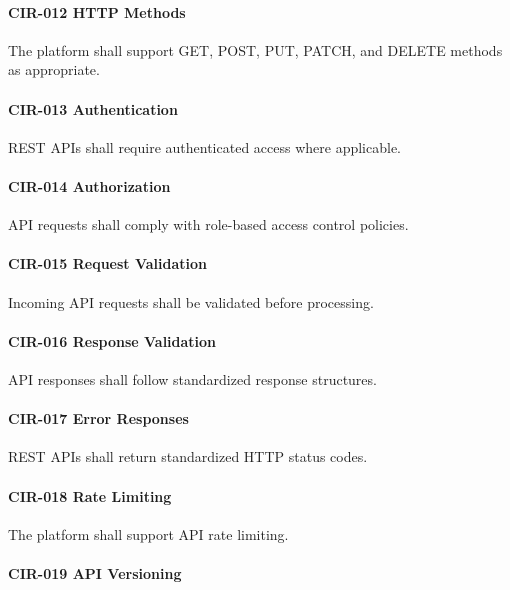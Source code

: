 \paragraph{CIR-012 HTTP Methods}

The platform shall support GET, POST, PUT, PATCH, and DELETE methods as
appropriate.

\paragraph{CIR-013 Authentication}

REST APIs shall require authenticated access where applicable.

\paragraph{CIR-014 Authorization}

API requests shall comply with role-based access control policies.

\paragraph{CIR-015 Request Validation}

Incoming API requests shall be validated before processing.

\paragraph{CIR-016 Response Validation}

API responses shall follow standardized response structures.

\paragraph{CIR-017 Error Responses}

REST APIs shall return standardized HTTP status codes.

\paragraph{CIR-018 Rate Limiting}

The platform shall support API rate limiting.

\paragraph{CIR-019 API Versioning}

